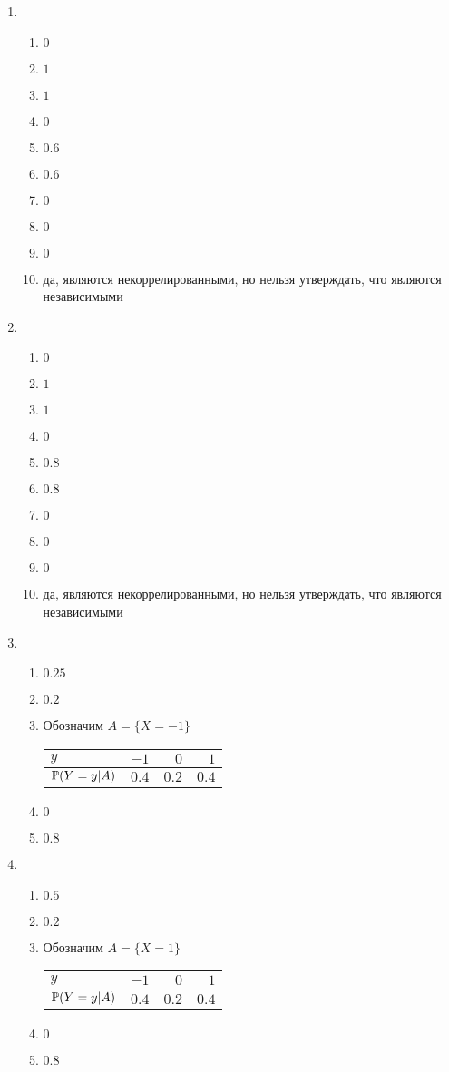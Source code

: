 \begin{multicols}{2}
\begin{enumerate}
\item
\begin{enumerate}
\item $0$
\item $1$
\item $1$
\item $0$
\item $0.6$
\item $0.6$
\item $0$
\item $0$
\item $0$
\item да, являются некоррелированными, но нельзя утверждать, что являются независимыми
\end{enumerate}

\item
\begin{enumerate}
\item $0$
\item $1$
\item $1$
\item $0$
\item $0.8$
\item $0.8$
\item $0$
\item $0$
\item $0$
\item да, являются некоррелированными, но нельзя утверждать, что являются независимыми
\end{enumerate}

\item
\begin{enumerate}
\item $0.25$
\item $0.2$
\item Обозначим $A = \{X = -1\}$

\begin{tabular}{lrrr}
\toprule
$y$           & $-1$  & $0$   & $1$   \\ \midrule
$\P(Y=y|A)$   & $0.4$ & $0.2$ & $0.4$ \\ \bottomrule
\end{tabular}
\item $0$
\item $0.8 $
\end{enumerate}
\item
\begin{enumerate}
\item $0.5$
\item $0.2$
\item Обозначим $A = \{X = 1\}$
\begin{tabular}{lrrr}
\toprule
$y$ & $-1$  & $0$   & $1$   \\ \midrule
$\P(Y=y|A)$             & $0.4$ & $0.2$ & $0.4$ \\ \bottomrule
\end{tabular}
\item $0$
\item $0.8$
\end{enumerate}


\end{enumerate}
\end{multicols}
